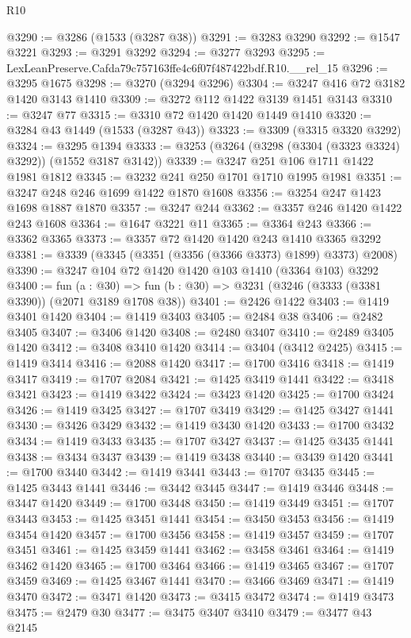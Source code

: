 \begin{lexlean}{R10}
\begin{coremodule}
@3290 := @3286 (@1533 (@3287 @38))
@3291 := @3283 @3290
@3292 := @1547 @3221
@3293 := @3291 @3292
@3294 := @3277 @3293
@3295 := LexLeanPreserve.Cafda79c757163ffe4c6f07f487422bdf.R10.__rel_15
@3296 := @3295 @1675
@3298 := @3270 (@3294 @3296)
@3304 := @3247 @416 @72 @3182 @1420 @3143 @1410
@3309 := @3272 @112 @1422 @3139 @1451 @3143
@3310 := @3247 @77
@3315 := @3310 @72 @1420 @1420 @1449 @1410
@3320 := @3284 @43 @1449 (@1533 (@3287 @43))
@3323 := @3309 (@3315 @3320 @3292)
@3324 := @3295 @1394
@3333 := @3253 (@3264 (@3298 (@3304 (@3323 @3324) @3292)) (@1552 @3187 @3142))
@3339 := @3247 @251 @106 @1711 @1422 @1981 @1812
@3345 := @3232 @241 @250 @1701 @1710 @1995 @1981
@3351 := @3247 @248 @246 @1699 @1422 @1870 @1608
@3356 := @3254 @247 @1423 @1698 @1887 @1870
@3357 := @3247 @244
@3362 := @3357 @246 @1420 @1422 @243 @1608
@3364 := @1647 @3221 @11
@3365 := @3364 @243
@3366 := @3362 @3365
@3373 := @3357 @72 @1420 @1420 @243 @1410 @3365 @3292
@3381 := @3339 (@3345 (@3351 (@3356 (@3366 @3373) @1899) @3373) @2008)
@3390 := @3247 @104 @72 @1420 @1420 @103 @1410 (@3364 @103) @3292
@3400 := fun (a : @30) =>
  fun (b : @30) => @3231 (@3246 (@3333 (@3381 @3390)) (@2071 @3189 @1708 @38))
@3401 := @2426 @1422
@3403 := @1419 @3401 @1420
@3404 := @1419 @3403
@3405 := @2484 @38
@3406 := @2482 @3405
@3407 := @3406 @1420
@3408 := @2480 @3407
@3410 := @2489 @3405 @1420
@3412 := @3408 @3410 @1420
@3414 := @3404 (@3412 @2425)
@3415 := @1419 @3414
@3416 := @2088 @1420
@3417 := @1700 @3416
@3418 := @1419 @3417
@3419 := @1707 @2084
@3421 := @1425 @3419 @1441
@3422 := @3418 @3421
@3423 := @1419 @3422
@3424 := @3423 @1420
@3425 := @1700 @3424
@3426 := @1419 @3425
@3427 := @1707 @3419
@3429 := @1425 @3427 @1441
@3430 := @3426 @3429
@3432 := @1419 @3430 @1420
@3433 := @1700 @3432
@3434 := @1419 @3433
@3435 := @1707 @3427
@3437 := @1425 @3435 @1441
@3438 := @3434 @3437
@3439 := @1419 @3438
@3440 := @3439 @1420
@3441 := @1700 @3440
@3442 := @1419 @3441
@3443 := @1707 @3435
@3445 := @1425 @3443 @1441
@3446 := @3442 @3445
@3447 := @1419 @3446
@3448 := @3447 @1420
@3449 := @1700 @3448
@3450 := @1419 @3449
@3451 := @1707 @3443
@3453 := @1425 @3451 @1441
@3454 := @3450 @3453
@3456 := @1419 @3454 @1420
@3457 := @1700 @3456
@3458 := @1419 @3457
@3459 := @1707 @3451
@3461 := @1425 @3459 @1441
@3462 := @3458 @3461
@3464 := @1419 @3462 @1420
@3465 := @1700 @3464
@3466 := @1419 @3465
@3467 := @1707 @3459
@3469 := @1425 @3467 @1441
@3470 := @3466 @3469
@3471 := @1419 @3470
@3472 := @3471 @1420
@3473 := @3415 @3472
@3474 := @1419 @3473
@3475 := @2479 @30
@3477 := @3475 @3407 @3410
@3479 := @3477 @43 @2145

\end{coremodule}
\end{lexlean}

